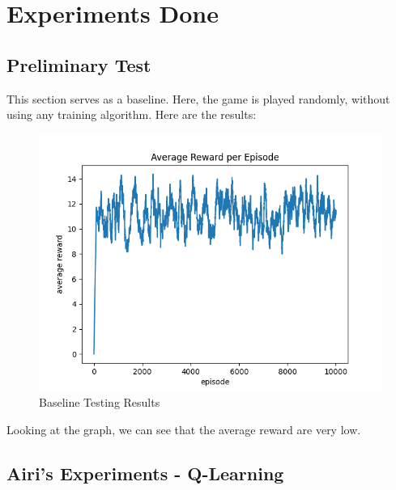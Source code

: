 \section{Experiments Done}

\subsection{Preliminary Test}

This section serves as a baseline. Here, the game is played randomly, without using any training algorithm. Here are the results:

\begin{figure}[H] %
    \centering
    \includegraphics[width=0.75\linewidth]{random-action.png}
    \caption{Baseline Testing Results}
\end{figure}

Looking at the graph, we can see that the average reward are very low.
\subsection{Airi's Experiments - Q-Learning}




